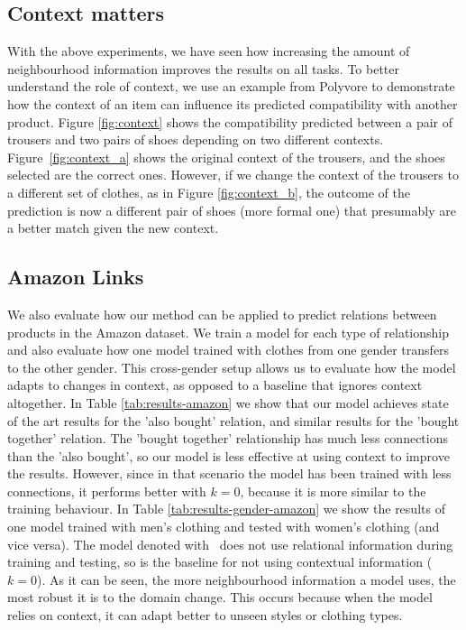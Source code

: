 \documentclass[10pt,twocolumn,letterpaper]{article}
\begin{document}
\subsection{Context matters}
With the above experiments, we have seen how increasing the amount of neighbourhood information improves the results on all tasks. To better understand the role of context, 
we use an example from Polyvore to demonstrate how the context of an item can influence its predicted compatibility with another product. 
Figure \ref{fig:context} 
shows the compatibility predicted between a pair of trousers and two pairs of shoes depending on two different contexts. Figure~\ref{fig:context_a} shows the original context of the trousers, and the shoes selected are the correct ones. However, if we change the context of the trousers to a different set of clothes, as in Figure \ref{fig:context_b}, the outcome of the prediction is now a different pair of shoes (more formal one) that presumably are a better match given the new context.

\subsection{Amazon Links}
We also evaluate how our method can be applied to predict relations between products in the Amazon dataset. We train a model for each type of relationship and also evaluate how one model trained with clothes from one gender transfers to the other gender. This cross-gender setup allows us to evaluate how the model adapts to changes in context, as opposed to a baseline that ignores context altogether. In Table \ref{tab:results-amazon} we show that our model achieves state of the art results for the 'also bought' relation, and similar results for the 'bought together' relation. The 'bought together' relationship has much less connections than the 'also bought', so our model is less effective at using context to improve the results. However, since in that scenario the model has been trained with less connections, it performs better with $k=0$, because it is more similar to the training behaviour. In Table \ref{tab:results-gender-amazon} we show the results of one model trained with men's clothing and tested with women's clothing (and vice versa). The model denoted with \textdagger ~does not use relational information during training and testing, so is the baseline for not using contextual information ($k=0$). As it can be seen, the more neighbourhood information a model uses, the most robust it is to the domain change. This occurs because when the model relies on context, it can adapt better to unseen styles or clothing types.
\end{document}
